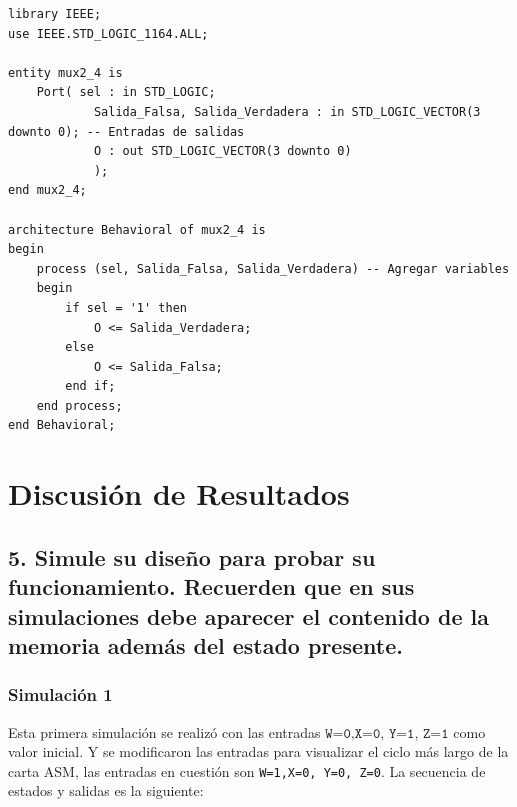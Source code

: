 \documentclass[12pt, letterpaper]{article}
\begin{document}
\begin{lstlisting}[style=vhdl, caption={Código completo del multiplexor selector de salida.}, label={lst:mux2_4}]
library IEEE;
use IEEE.STD_LOGIC_1164.ALL;

entity mux2_4 is
	Port( sel : in STD_LOGIC;
			Salida_Falsa, Salida_Verdadera : in STD_LOGIC_VECTOR(3 downto 0); -- Entradas de salidas
			O : out STD_LOGIC_VECTOR(3 downto 0)
			);
end mux2_4;

architecture Behavioral of mux2_4 is
begin
	process (sel, Salida_Falsa, Salida_Verdadera) -- Agregar variables
	begin
		if sel = '1' then
			O <= Salida_Verdadera;
		else
			O <= Salida_Falsa;
		end if;
	end process;
end Behavioral;
\end{lstlisting}

\section*{Discusión de Resultados}

\subsection*{5. Simule su diseño para probar su funcionamiento. Recuerden que en sus simulaciones debe aparecer el contenido de la memoria además del estado presente.}

\subsubsection*{Simulación 1}

Esta primera simulación se realizó con las entradas \(\texttt{W=0,X=0, Y=1, Z=1}\) como valor inicial. Y se modificaron las entradas para visualizar el ciclo más largo de la carta ASM, las entradas en cuestión son \texttt{W=1,X=0, Y=0, Z=0}. La secuencia de estados y salidas es la siguiente:
\end{document}
